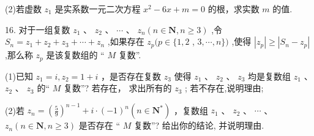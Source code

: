 (2)若虚数 ${z}_{1}$ 是实系数一元二次方程 ${x}^{2} - {6x} + m = 0$ 的根，求实数 $m$ 的值.

16. 对于一组复数 ${z}_{1}\text{ 、 }{z}_{2}\text{ 、 }\cdots \text{ 、 }{z}_{n}\left( {n \in  \mathbf{N},n \geq  3}\right)$ ,令 ${S}_{n} = {z}_{1} + {z}_{2} + {z}_{3} + \cdots  + {z}_{n}$ ,如果存在 ${z}_{p}(p \in  \{ 1,2$ , $3,\cdots ,n\} )$ ,使得 $\left| {z}_{p}\right|  \geq  \left| {{S}_{n} - {z}_{p}}\right|$ ,那么称 ${z}_{p}$ 是该复数组的 “ $M$ 复数”.

(1)已知 ${z}_{1} = {i},{z}_{2} = 1 + {i}$ ，是否存在复数 ${z}_{3}$ 使得 ${z}_{1}$ 、 ${z}_{2}$ 、 ${z}_{3}$ 均是复数组 ${z}_{1}$ 、 ${z}_{2}$ 、 ${z}_{3}$ 的“ $M$ 复数”? 若存在， 求出所有的 ${z}_{3}$ ; 若不存在,说明理由;

(2)若 ${z}_{n} = {\left( \frac{5}{9}\right) }^{n - 1} + {i} \cdot  {\left( -1\right) }^{n}\left( {n \in  {\mathbf{N}}^{ * }}\right)$ ，复数组 ${z}_{1}$ 、 ${z}_{2}$ 、 $\cdots$ 、 ${z}_{n}\left( {n \in  \mathbf{N},n \geq  3}\right)$ 是否存在 “ $M$ 复数”? 给出你的结论, 并说明理由.

